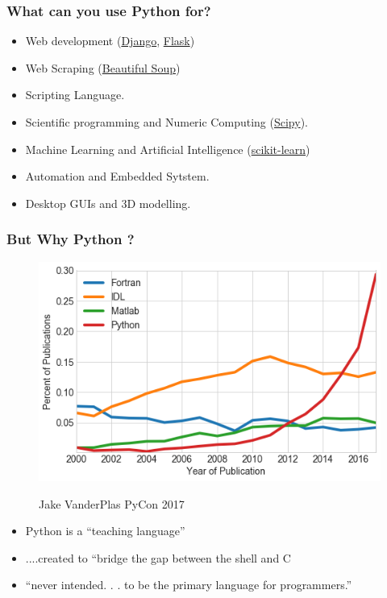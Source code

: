 \documentclass{bredelebeamer}
\begin{document}
\begin{frame}\frametitle{What can you use Python for?}

\begin{itemize}
\item Web development (\href{https://www.djangoproject.com/}{Django}, \href{http://flask.pocoo.org/}{Flask})
\item Web Scraping (\href{https://www.djangoproject.com/}{Beautiful Soup})
\item Scripting Language.
\item Scientific programming and Numeric Computing (\href{https://www.scipy.org/}{Scipy}).
\item Machine Learning and Artificial Intelligence (\href{http://scikit-learn.org/}{scikit-learn})
\item Automation and Embedded Sytstem.
\item Desktop GUIs and 3D modelling. 
\end{itemize}
\end{frame}	
	
\begin{frame}\frametitle{But Why Python ?}
\begin{multicols}{2}
\begin{figure}[h]
		\includegraphics[scale=0.30]{../image/whypython.png}
		\label{fig:result1}
		\caption{Jake VanderPlas PyCon 2017}
\end{figure}
\columnbreak
\begin{itemize}
	\item Python is a “teaching language”
	\item ....created to “bridge the gap between the shell and C
	\item  “never intended. . . to be the primary language for programmers.”
\end{itemize}

\end{multicols}	
\end{frame}	
\end{document}
